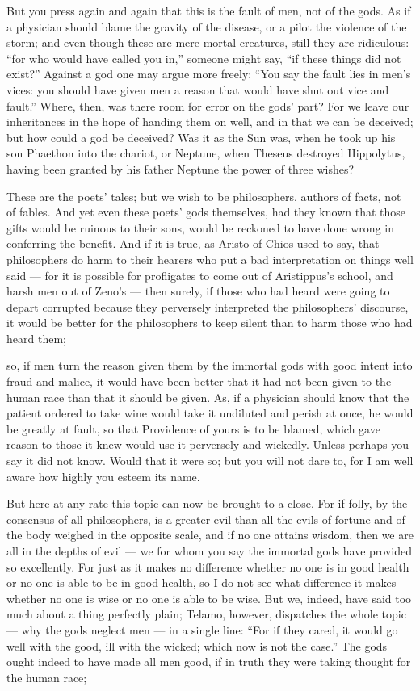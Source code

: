  But you press again and again that this is the fault of men, not of the gods. As if a physician should blame the gravity of the disease, or a pilot the violence of the storm; and even though these are mere mortal creatures, still they are ridiculous: ``for who would have called you in,'' someone might say, ``if these things did not exist?'' Against a god one may argue more freely: ``You say the fault lies in men's vices: you should have given men a reason that would have shut out vice and fault.'' Where, then, was there room for error on the gods' part? For we leave our inheritances in the hope of handing them on well, and in that we can be deceived; but how could a god be deceived? Was it as the Sun was, when he took up his son Phaethon into the chariot, or Neptune, when Theseus destroyed Hippolytus, having been granted by his father Neptune the power of three wishes?

 These are the poets' tales; but we wish to be philosophers, authors of facts, not of fables. And yet even these poets' gods themselves, had they known that those gifts would be ruinous to their sons, would be reckoned to have done wrong in conferring the benefit. And if it is true, as Aristo of Chios used to say, that philosophers do harm to their hearers who put a bad interpretation on things well said — for it is possible for profligates to come out of Aristippus's school, and harsh men out of Zeno's — then surely, if those who had heard were going to depart corrupted because they perversely interpreted the philosophers' discourse, it would be better for the philosophers to keep silent than to harm those who had heard them;

 so, if men turn the reason given them by the immortal gods with good intent into fraud and malice, it would have been better that it had not been given to the human race than that it should be given. As, if a physician should know that the patient ordered to take wine would take it undiluted and perish at once, he would be greatly at fault, so that Providence of yours is to be blamed, which gave reason to those it knew would use it perversely and wickedly. Unless perhaps you say it did not know. Would that it were so; but you will not dare to, for I am well aware how highly you esteem its name.

 But here at any rate this topic can now be brought to a close. For if folly, by the consensus of all philosophers, is a greater evil than all the evils of fortune and of the body weighed in the opposite scale, and if no one attains wisdom, then we are all in the depths of evil — we for whom you say the immortal gods have provided so excellently. For just as it makes no difference whether no one is in good health or no one is able to be in good health, so I do not see what difference it makes whether no one is wise or no one is able to be wise. But we, indeed, have said too much about a thing perfectly plain; Telamo, however, dispatches the whole topic — why the gods neglect men — in a single line: ``For if they cared, it would go well with the good, ill with the wicked; which now is not the case.'' The gods ought indeed to have made all men good, if in truth they were taking thought for the human race;

